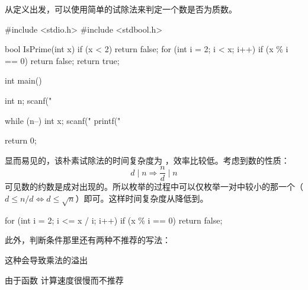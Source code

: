 从定义出发，可以使用简单的试除法来判定一个数是否为质数。

\begin{mycpptwocol}[朴素试除法]
    #include <stdio.h>
    #include <stdbool.h>

    bool IsPrime(int x) {
        if (x < 2) {
            return false;
        }
        for (int i = 2; i < x; i++) {
            if (x \% i == 0) {
                return false;
            }
        }
        return true;
    }

    int main() {
        int n;
        scanf("%

        while (n--) {
            int x;
            scanf("%
            printf("%
        }

        return 0;
    }
\end{mycpptwocol}

显而易见的，该朴素试除法的时间复杂度为 ，效率比较低。考虑到数的性质：
\begin{equation*}
    d \mid n \Rightarrow \frac{n}{d} \mid n
\end{equation*}
可见数的约数是成对出现的。所以枚举的过程中可以仅枚举一对中较小的那一个（$d \le n / d \Leftrightarrow d \le \sqrt{n}$）即可。这样时间复杂度从降低到。

\begin{mycpponecol}[优化试除法]
    for (int i = 2; i <= x / i; i++) {
        if (x \% i == 0) {
            return false;
        }
    }
\end{mycpponecol}

此外，判断条件那里还有两种不推荐的写法：
\begin{mylist}
    \item {} 这种会导致乘法的溢出
    \item {} 由于函数  计算速度很慢而不推荐
\end{mylist}

